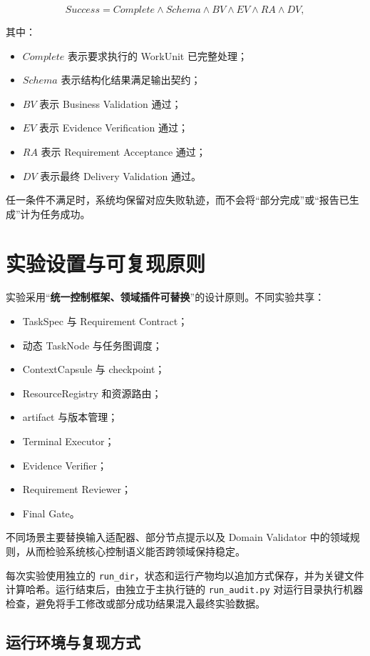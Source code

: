 \documentclass[UTF8,a4paper,12pt,oneside]{ctexbook}
\begin{document}
\[
Success
=
Complete
\land
Schema
\land
BV
\land
EV
\land
RA
\land
DV,
\]

其中：

\begin{itemize}
    \item $Complete$ 表示要求执行的 WorkUnit 已完整处理；
    \item $Schema$ 表示结构化结果满足输出契约；
    \item $BV$ 表示 Business Validation 通过；
    \item $EV$ 表示 Evidence Verification 通过；
    \item $RA$ 表示 Requirement Acceptance 通过；
    \item $DV$ 表示最终 Delivery Validation 通过。
\end{itemize}

任一条件不满足时，系统均保留对应失败轨迹，而不会将“部分完成”或“报告已生成”计为任务成功。


\section{实验设置与可复现原则}

实验采用“\textbf{统一控制框架、领域插件可替换}”的设计原则。不同实验共享：

\begin{itemize}
    \item TaskSpec 与 Requirement Contract；
    \item 动态 TaskNode 与任务图调度；
    \item ContextCapsule 与 checkpoint；
    \item ResourceRegistry 和资源路由；
    \item artifact 与版本管理；
    \item Terminal Executor；
    \item Evidence Verifier；
    \item Requirement Reviewer；
    \item Final Gate。
\end{itemize}

不同场景主要替换输入适配器、部分节点提示以及 Domain Validator 中的领域规则，从而检验系统核心控制语义能否跨领域保持稳定。

每次实验使用独立的 \texttt{run\_dir}，状态和运行产物均以追加方式保存，并为关键文件计算哈希。运行结束后，由独立于主执行链的 \texttt{run\_audit.py} 对运行目录执行机器检查，避免将手工修改或部分成功结果混入最终实验数据。


\subsection{运行环境与复现方式}
\end{document}
